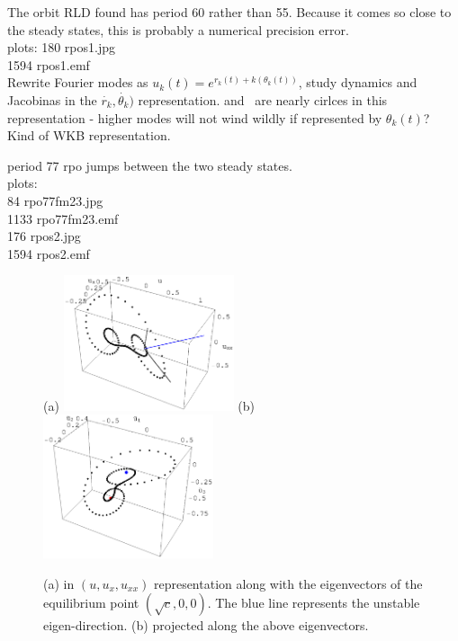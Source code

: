 The orbit RLD found has period 60 
rather than 55.  Because it comes so close to the steady states, 
this is probably a numerical precision error.
\\
plots:
 180 rpos1.jpg  \\
1594 rpos1.emf  \\


Rewrite Fourier modes as $u_k(t) = e^{r_k(t) + k(\theta_k(t))}$, study
dynamics and Jacobinas in the $\dot{r_k},\dot{\theta_k})$ representation.
 and  \eqva\ are nearly cirlces in this representation - higher
modes will not wind wildly if represented by $\theta_k(t)$? Kind of WKB
representation.

period 77 rpo jumps between the two steady states.
\\
plots:  \\
  84 rpo77fm23.jpg  \\
1133 rpo77fm23.emf  \\
 176 rpos2.jpg  \\
1594 rpos2.emf  \\


\bigskip

\begin{figure}[t]
\begin{center} 
(a) \includegraphics[width=5.0cm]{figs/1wSteadyE.eps}
\hspace{0.1in}
(b) \includegraphics[width=5.0cm]{figs/1wSteadyP.eps}
\end{center}
\caption{
(a)  in $(u,u_x,u_{xx})$ representation along with the eigenvectors of the equilibrium
point $(\sqrt{c},0,0)$. The blue line represents the unstable eigen-direction.
(b)  projected along the above eigenvectors.
}
\label{f:1wSteady}
\end{figure}



